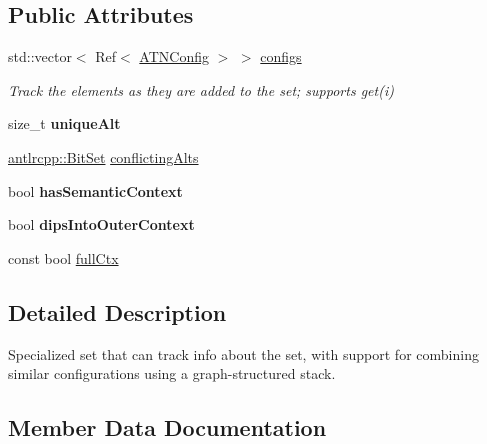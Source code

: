 \subsection*{Public Attributes}
\begin{DoxyCompactItemize}
\item 
\mbox{\label{classantlr4_1_1atn_1_1ATNConfigSet_a5404495afc6bb7823429d202a1625bdc}} 
std\+::vector$<$ Ref$<$ \hyperlink{classantlr4_1_1atn_1_1ATNConfig}{A\+T\+N\+Config} $>$ $>$ \hyperlink{classantlr4_1_1atn_1_1ATNConfigSet_a5404495afc6bb7823429d202a1625bdc}{configs}
\begin{DoxyCompactList}\small\item\em Track the elements as they are added to the set; supports get(i) \end{DoxyCompactList}\item 
\mbox{\label{classantlr4_1_1atn_1_1ATNConfigSet_abbb020e6f64f01e7bd959551afb1fc93}} 
size\+\_\+t {\bfseries unique\+Alt}
\item 
\hyperlink{classantlrcpp_1_1BitSet}{antlrcpp\+::\+Bit\+Set} \hyperlink{classantlr4_1_1atn_1_1ATNConfigSet_a37b30c5a21147bdc63325cffd2f99041}{conflicting\+Alts}
\item 
\mbox{\label{classantlr4_1_1atn_1_1ATNConfigSet_acf4dc336b07151064e0acdd84d5a6dcc}} 
bool {\bfseries has\+Semantic\+Context}
\item 
\mbox{\label{classantlr4_1_1atn_1_1ATNConfigSet_a8ed06e3a821509fe0f003c00e2a14676}} 
bool {\bfseries dips\+Into\+Outer\+Context}
\item 
const bool \hyperlink{classantlr4_1_1atn_1_1ATNConfigSet_af5ef274bd4b6185f2865add7f943633c}{full\+Ctx}
\end{DoxyCompactItemize}


\subsection{Detailed Description}
Specialized set that can track info about the set, with support for combining similar configurations using a graph-\/structured stack. 

\subsection{Member Data Documentation}
\mbox{\label{classantlr4_1_1atn_1_1ATNConfigSet_a37b30c5a21147bdc63325cffd2f99041}} 
